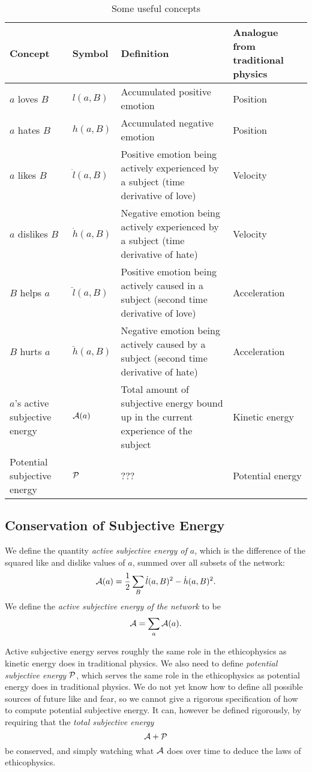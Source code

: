 \documentclass{article}
\begin{document}
\begin{table}
\label{tab-concepts}
\begin{tabular}[c]{|m{0.75in}|m{0.5in}|m{2in}|m{0.75in}|}
\hline
Concept & Symbol & Definition & Analogue from traditional physics\\
\hline
$a$ loves $B$ & $l(a, B)$ & Accumulated positive emotion & Position\\
\hline
$a$ hates $B$ & $h(a, B)$ & Accumulated negative emotion & Position\\
\hline
$a$ likes $B$ & $\dot{l}(a, B)$ & Positive emotion being actively experienced by a subject (time derivative of love) & Velocity\\
\hline
$a$ dislikes $B$ & $\dot{h}(a, B)$ & Negative emotion being actively experienced by a subject (time derivative of hate) & Velocity\\
\hline
$B$ helps $a$ & $\ddot{l}(a, B)$ & Positive emotion being actively caused in a subject (second time derivative of love) 
 & Acceleration\\
\hline
$B$ hurts $a$ & $\ddot{h}(a, B)$ & Negative emotion being actively caused by a subject (second time derivative of hate) 
 & Acceleration\\
\hline
$a$'s active subjective energy & ${\mathcal A}(a)$ & Total amount of subjective energy bound up in the current experience of the subject
& Kinetic energy \\
\hline
Potential subjective energy & ${\mathcal P}$ & ???
& Potential energy \\
\hline
\end{tabular}
\caption{Some useful concepts}
\end{table}

\subsection{Conservation of Subjective Energy}

We define the quantity {\em active subjective energy of $a$}, which is
the difference of the squared like and dislike values of $a$, summed
over all subsets of the network:
$${\mathcal A}(a) = \frac{1}{2} \sum_B \dot{l}(a, B)^2 - \dot{h}(a, B)^2.$$ 
We define the {\em active subjective energy of the network} to be
$${\mathcal A} = \sum_a {\mathcal A}(a).$$ 

Active subjective energy serves roughly the same role in the
ethicophysics as kinetic energy does in traditional physics. We also
need to define {\em potential subjective energy} ${\mathcal P}$, which
serves the same role in the ethicophysics as potential energy does in
traditional physics. We do not yet know how to define all possible
sources of future like and fear, so we cannot give a rigorous
specification of how to compute potential subjective energy. It can,
however be defined rigorously, by requiring that the {\em total
  subjective energy}
$${\mathcal A} + {\mathcal P}$$ be conserved, and simply watching what ${\mathcal A}$ does
over time to deduce the laws of ethicophysics.
\end{document}

